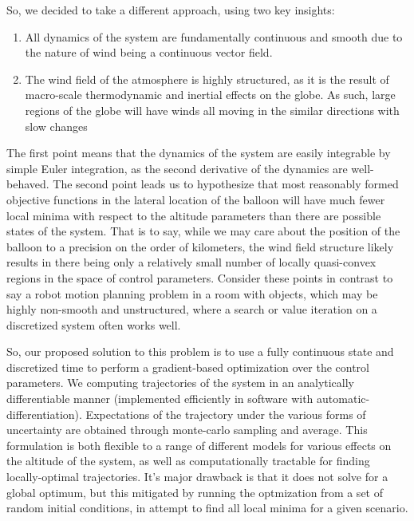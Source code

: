 \documentclass[11pt]{scrartcl} %
\begin{document}
So, we decided to take a different approach, using two key insights:
\begin{enumerate}
\item All dynamics of the system are fundamentally continuous and smooth due to the nature of wind being a continuous vector field.
\item The wind field of the atmosphere is highly structured, as it is the result of macro-scale thermodynamic and inertial effects on the globe. As such, large regions of the globe will have  winds all moving in the similar directions with slow changes
\end{enumerate}
The first point means that the dynamics of the system are easily integrable by simple Euler integration, as the second derivative of the dynamics are well-behaved. The second point leads us to hypothesize that most reasonably formed objective functions in the lateral location of the balloon will have much fewer local minima with respect to the altitude parameters than there are possible states of the system.  That is to say, while we may care about the position of the balloon to a precision on the order of kilometers, the wind field structure likely results in there being only a relatively small number of locally quasi-convex regions in the space of control parameters. Consider these points in contrast to say a robot motion planning problem in a room with objects, which may be highly non-smooth and unstructured, where a search or value iteration on a discretized system often works well. 

So, our proposed solution to this problem is to use a fully continuous state and discretized time to perform a gradient-based optimization over the control parameters. We computing trajectories of the system in an analytically differentiable manner (implemented efficiently in software with automatic-differentiation). Expectations of the trajectory under the various forms of uncertainty are obtained through monte-carlo sampling and average. This formulation is both flexible to a range of different models for various effects on the altitude of the system, as well as computationally tractable for finding locally-optimal trajectories. It's major drawback is that it does not solve for a global optimum, but this mitigated by running the optmization from a set of random initial conditions, in attempt to find all local minima for a given scenario. 
\end{document}
